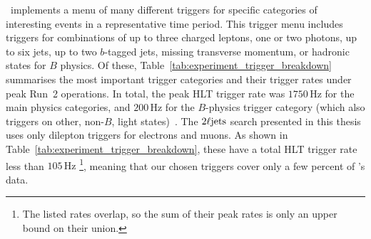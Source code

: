 \atlas\ implements a menu of many different triggers for specific categories of
interesting events in a representative time period.
This trigger menu includes triggers for combinations of up to three charged
leptons, one or two photons, up to six jets, up to two $b$-tagged jets, missing
transverse momentum, or hadronic states for $B$ physics.
Of these, Table~\ref{tab:experiment_trigger_breakdown} summarises the most
important trigger categories and their trigger rates under peak Run~2
operations.
In total, the peak HLT trigger rate was $1750\,\mathrm{Hz}$ for the main
physics categories, and $200\,\mathrm{Hz}$ for the $B$-physics trigger category
(which also triggers on other, non-$B$, light
states)~\cite{ATL-DAQ-PUB-2019-001}.
The $2\ell\mathrm{jets}$ search presented in this thesis uses only dilepton triggers
for electrons and muons.
As shown in Table~\ref{tab:experiment_trigger_breakdown}, these have a total
HLT trigger rate less than $105\,\mathrm{Hz}$%
\footnote{%
The listed rates overlap, so the sum of their peak rates is only an upper
bound on their union.
},
meaning that our chosen triggers cover only a few percent of \atlas's data.

